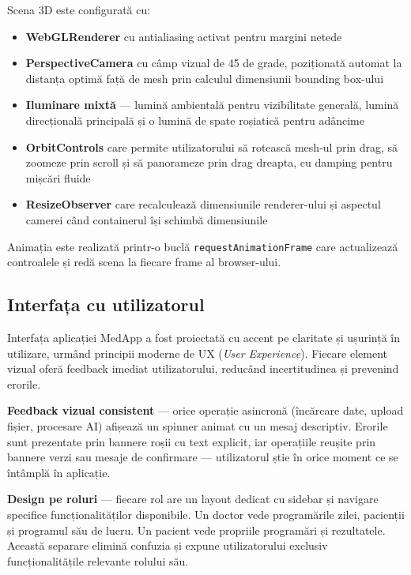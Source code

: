 \documentclass[12pt, a4paper]{report}
\begin{document}
Scena 3D este configurată cu:
\begin{itemize}
    \item \textbf{WebGLRenderer} cu antialiasing activat pentru margini netede
    \item \textbf{PerspectiveCamera} cu câmp vizual de 45 de grade, poziționată
          automat la distanța optimă față de mesh prin calculul dimensiunii
          bounding box-ului
    \item \textbf{Iluminare mixtă} --- lumină ambientală pentru vizibilitate
          generală, lumină direcțională principală și o lumină de spate roșiatică
          pentru adâncime
    \item \textbf{OrbitControls} care permite utilizatorului să rotească mesh-ul
          prin drag, să zoomeze prin scroll și să panorameze prin drag dreapta,
          cu damping pentru mișcări fluide
    \item \textbf{ResizeObserver} care recalculează dimensiunile renderer-ului
          și aspectul camerei când containerul își schimbă dimensiunile
\end{itemize}

Animația este realizată printr-o buclă \texttt{requestAnimationFrame} care
actualizează controalele și redă scena la fiecare frame al browser-ului.



\subsection{Interfața cu utilizatorul}

Interfața aplicației MedApp a fost proiectată cu accent pe claritate și ușurință
în utilizare, urmând principii moderne de UX (\textit{User Experience}). Fiecare
element vizual oferă feedback imediat utilizatorului, reducând incertitudinea și
prevenind erorile.

\textbf{Feedback vizual consistent} --- orice operație asincronă (încărcare date,
upload fișier, procesare AI) afișează un spinner animat cu un mesaj descriptiv.
Erorile sunt prezentate prin bannere roșii cu text explicit, iar operațiile
reușite prin bannere verzi sau mesaje de confirmare --- utilizatorul știe în
orice moment ce se întâmplă în aplicație.

\textbf{Design pe roluri} --- fiecare rol are un layout dedicat cu sidebar și
navigare specifice funcționalităților disponibile. Un doctor vede programările
zilei, pacienții și programul său de lucru. Un pacient vede propriile programări
și rezultatele. Această separare elimină confuzia și expune utilizatorului
exclusiv funcționalitățile relevante rolului său.
\end{document}
